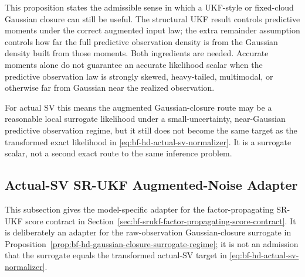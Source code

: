 This proposition states the admissible sense in which a UKF-style or
fixed-cloud Gaussian closure can still be useful.  The structural UKF result
controls predictive moments under the correct augmented input law; the extra
remainder assumption controls how far the full predictive observation density is
from the Gaussian density built from those moments.  Both ingredients are needed.
Accurate moments alone do not guarantee an accurate likelihood scalar when the
predictive observation law is strongly skewed, heavy-tailed, multimodal, or
otherwise far from Gaussian near the realized observation.

For actual SV this means the augmented Gaussian-closure route may be a reasonable
local surrogate likelihood under a small-uncertainty, near-Gaussian predictive
observation regime, but it still does not become the same target as the
transformed exact likelihood in \eqref{eq:bf-hd-actual-sv-normalizer}.  It is a
surrogate scalar, not a second exact route to the same inference problem.

\subsection{Actual-SV SR-UKF Augmented-Noise Adapter}
\label{sec:bf-hd-actual-sv-srukf-augmented-adapter}

This subsection gives the model-specific adapter for the factor-propagating
SR-UKF score contract in
Section~\ref{sec:bf-srukf-factor-propagating-score-contract}.  It is deliberately
an adapter for the raw-observation Gaussian-closure surrogate in
Proposition~\ref{prop:bf-hd-gaussian-closure-surrogate-regime}; it is not an
admission that the surrogate equals the transformed actual-SV target in
\eqref{eq:bf-hd-actual-sv-normalizer}.

